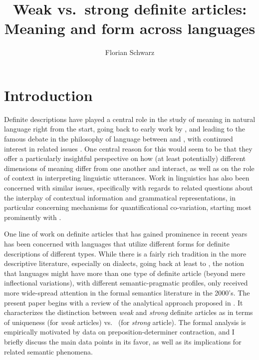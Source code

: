 \documentclass[output=paper
,modfonts
,nonflat]{langscibook}
\title{Weak vs.\ strong definite articles: Meaning and form across languages}
\author{Florian Schwarz\affiliation{University of Pennsylvania}
}
\begin{document}
\maketitle
\section{Introduction}
Definite descriptions have played a central role in the study of
meaning in natural language right from the start, going back to
early work by \citet{Frege1892}, and leading to the famous debate in
the philosophy of language between
\citet{Russell1905} and \citet{Strawson1950}, with continued interest
in related issues \citep[for an extensive collection, see][]{Reimer2004} . One central reason for
this would seem to be that they offer a particularly insightful
perspective on how (at least potentially) different dimensions of
meaning differ from one another and interact, as well as on the role
of context in interpreting linguistic utterances. Work
in linguistics has also been concerned with similar issues,
specifically with regards to related questions about the interplay
of contextual information and grammatical representations,
in particular concerning mechanisms for quantificational
co-variation, starting most prominently
with \citet{Heim1982} \citep[for a comprehensive recent proposal
from the perspective of situation semantics, see][]{Elbourne2013}.


One line of work on definite articles that has gained prominence in
recent years has been concerned with languages that utilize different
forms for definite descriptions of different types. While there is a
fairly rich tradition in the more descriptive literature, especially
on  dialects, going back at least to \citet{Heinrichs1954}, the
notion that languages might have more than one type of definite
article (beyond mere inflectional variations), with different
semantic-pragmatic profiles, only received more wide-spread attention
in the formal semantics literature in the 2000's. The present paper
begins with a review of the analytical approach proposed in
\citet{Schwarz2009}. It characterizes the distinction between \textit{weak}
and \textit{strong} definite articles as in terms of
uniqueness (for \textit{weak} articles) vs.\  (for \textit{strong}
article). The formal analysis is empirically motivated by  data on
 preposition-determiner contraction, and I briefly discuss the
main data points in its favor, as well as its implications for related
semantic phenomena. 
\end{document}
